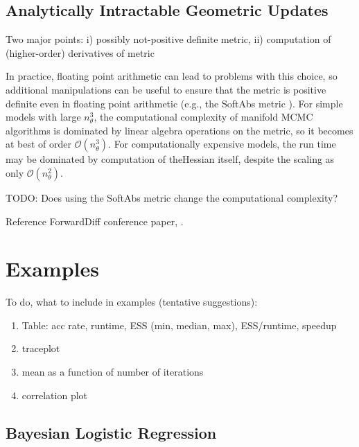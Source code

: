\documentclass[twoside,11pt]{article}
\begin{document}
\subsection{Analytically Intractable Geometric Updates}

Two major points: i) possibly not-positive definite metric, ii) computation of (higher-order) derivatives of metric

In practice, floating point arithmetic can lead to problems with this choice, so additional manipulations can be useful to 
ensure that the metric is positive definite even in floating point arithmetic (e.g., the SoftAbs metric \cite{bet__age}).  
For simple models with large $n_\theta^3$, the computational complexity of manifold MCMC algorithms is dominated by linear 
algebra operations on the metric, so it becomes at best of order $\mathcal{O}(n_\theta^3)$.  
For computationally expensive models, the run time may be dominated by computation of theHessian itself, despite the scaling 
as only $\mathcal{O}(n_\theta^2)$.  

TODO: Does using the SoftAbs metric \cite{bet__age} change the computational complexity?

Reference ForwardDiff conference paper, \cite{rev_lub_pap__for}.

\section{Examples}
\label{Examples}

To do, what to include in examples (tentative suggestions):

\begin{enumerate}
	\item Table: acc rate, runtime, ESS (min, median, max), ESS/runtime, speedup
	\item traceplot
	\item mean as a function of number of iterations
	\item correlation plot
\end{enumerate}

\subsection{Bayesian Logistic Regression}
\end{document}
